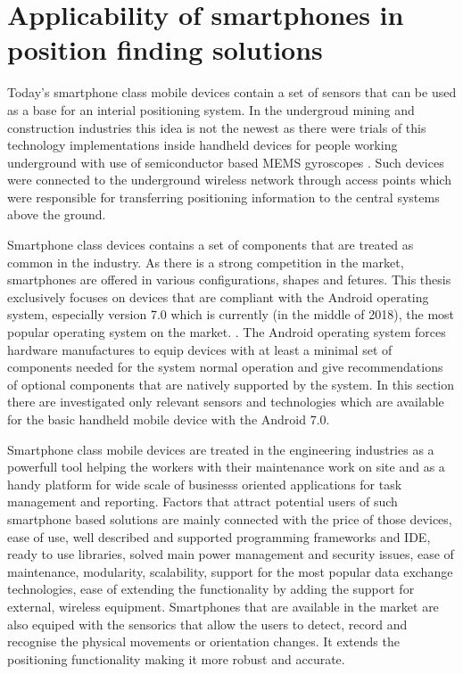 \documentclass[../main.tex]{subfiles}
\begin{document}

\section{Applicability of smartphones in position finding solutions} %
\label{sec:mobile_device_dedicated_positioning_systems}

Today's smartphone class mobile devices contain a set of sensors that can be used as a base for an interial positioning system. In the undergroud mining and construction industries this idea is not the newest as there were trials of this technology implementations inside handheld devices for people working underground with use of semiconductor based MEMS gyroscopes \cite{Thesis_CM}. Such devices were connected to the underground wireless network through access points which were responsible for transferring positioning information to the central systems above the ground.

Smartphone class devices contains a set of components that are treated as common in the industry. As there is a strong competition in the market, smartphones are offered in various configurations, shapes and fetures. This thesis exclusively focuses on devices that are compliant with the Android operating system, especially version 7.0 which is currently (in the middle of 2018), the most popular operating system on the market. \cite{android7.0_cdd}. The Android operating system forces hardware manufactures to equip devices with at least a minimal set of components needed for the system normal operation and give recommendations of optional components that are natively supported by the system\cite{android7.0_cdd}. In this section there are investigated only relevant sensors and technologies which are available for the basic handheld mobile device with the Android 7.0.

Smartphone class mobile devices are treated in the engineering industries as a powerfull tool helping the workers with their maintenance work on site and as a handy platform for wide scale of businesss oriented applications for task management and reporting. Factors that attract potential users of such smartphone based solutions are mainly connected with the price of those devices, ease of use, well described and supported programming frameworks and IDE, ready to use libraries, solved main power management and security issues, ease of maintenance, modularity, scalability, support for the most popular data exchange technologies, ease of extending the functionality by adding the support for external, wireless equipment. Smartphones that are available in the market are also equiped with the sensorics that allow the users to detect, record and recognise the physical movements or orientation changes. It extends the positioning functionality making it more robust and accurate\cite{article_Inertial-sensors-for-smartphones}\cite{article_inertial_test_smartphone}.
\end{document}
